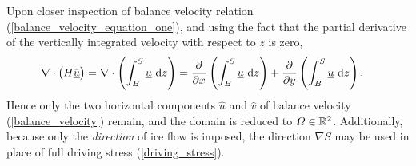 Upon closer inspection of balance velocity relation (\ref{balance_velocity_equation_one}), and using the fact that the partial derivative of the vertically integrated velocity with respect to $z$ is zero,
\begin{align*}
  \nabla \cdot \big( H \bar{\underline{u}} \big) &= \nabla \cdot \left( \int_B^S \underline{u} \ \mathrm{d}z \right) = \frac{\partial^{} }{\partial x^{} } \left( \int_B^S \underline{u} \ \mathrm{d}z \right)
     + \frac{\partial^{} }{\partial y^{} } \left( \int_B^S \underline{u} \ \mathrm{d}z \right).
\end{align*}
Hence only the two horizontal components $\hat{u}$ and $\hat{v}$ of balance velocity (\ref{balance_velocity}) remain, and the domain is reduced to $\varOmega \in \mathbb{R}^2$.  Additionally, because only the \emph{direction} of ice flow is imposed, the direction $\nabla S$ may be used in place of full driving stress (\ref{driving_stress}).

